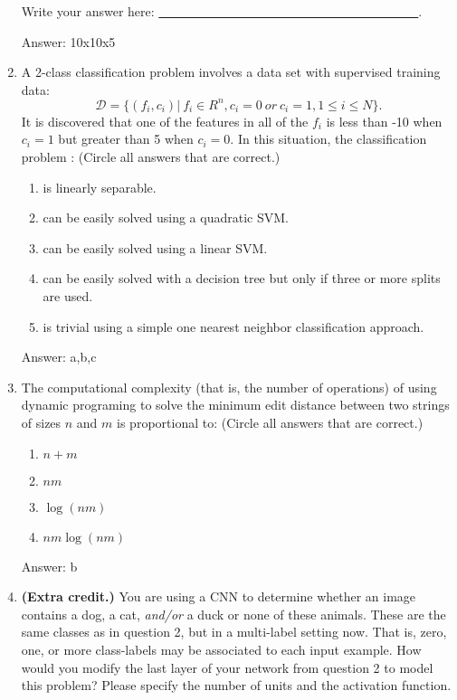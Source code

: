\documentclass[11pt]{report}
\begin{document}
\begin{enumerate}
Write your answer here:  \underline{~~~~~~~~~~~~~~~~~~~~~~~~~~~~~~~~~~~~~~~~~}.  
\begin{mdframed}
Answer: 10x10x5
\end{mdframed}
\item
A 2-class classification problem involves a data set with supervised training data:
$$\mathscr{D} = \{ (f_i,c_i)| ~f_i \in R^n, c_i =0~or~c_i=1, 1 \leq i \leq N\}. $$
It is discovered that one of the features in all of the $f_i$ is less than -10 when $c_i=1$ but
greater than 5 when $c_i=0$.  In this situation, the classification problem : (Circle all answers that are correct.)
\begin{enumerate}
\item is linearly separable.
\item can be easily solved using a quadratic SVM.
\item can be easily solved using a linear SVM.
\item can be easily solved with a decision tree but only if three or more splits are used.
\item  is trivial using a simple one nearest neighbor classification approach.
\end{enumerate}
\begin{mdframed}
Answer: a,b,c
\end{mdframed}
\item
The computational complexity (that is, the number of operations) of using dynamic programing to solve the minimum edit distance between two strings of sizes $n$ and $m$ is proportional to: (Circle all answers that are correct.)
\begin{enumerate}
\item  $n+m$
\item $nm$
\item $\log(nm)$
\item  $nm\log(nm)$
\end{enumerate}
\begin{mdframed}
Answer: b
\end{mdframed}

\item {\bf (Extra credit.)}
You are using a CNN to determine whether an image contains
a dog, a cat, {\em and/or} a duck or none of these animals. These are the same classes as in question 2, but in a multi-label setting now. That is, zero, one, or more class-labels may be associated to each input example. How would you modify the last layer of your network from question 2 to model this problem? Please specify the number of units and the activation function.


\end{enumerate}
\end{document}
